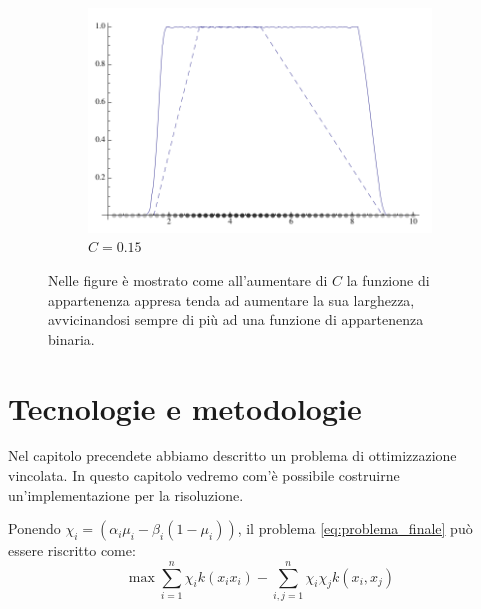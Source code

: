 \documentclass[a4paper,12pt]{report}
\begin{document}
\begin{figure}[h]
\begin{subfigure}[t]{0.32\textwidth}
    \end{subfigure}
    \begin{subfigure}[t]{0.32\textwidth}
        \centering
        \includegraphics[scale=0.18]{images/parametro_C_3.png}
        \caption{$C = 0.15 $}
        \label{fig:C_3}
    \end{subfigure}
    \caption{Nelle figure è mostrato come all'aumentare di $C$ la funzione di appartenenza appresa tenda ad aumentare la sua larghezza, avvicinandosi sempre di più ad una funzione di appartenenza binaria.}
    \label{fig:parametro_C}
\end{figure}






%
%

\chapter{Tecnologie e metodologie}
\label{Capitolo 2}
Nel capitolo precendete abbiamo descritto un problema di ottimizzazione vincolata. In questo capitolo vedremo com'è possibile costruirne un'implementazione per la risoluzione.

\bigskip

\noindent Ponendo $\chi_i = (\alpha_i\mu_i - \beta_i(1-\mu_i))$, il problema \ref{eq:problema_finale} può essere riscritto come:
\begin{equation}
    \max \displaystyle\sum_{i=1}^{n}\chi_ik(x_ix_i) -\displaystyle\sum_{i,j=1}^{n}\chi_i\chi_j k(x_i,x_j)
\label{eq:problema_finale_2}
\end{equation}
\end{document}
